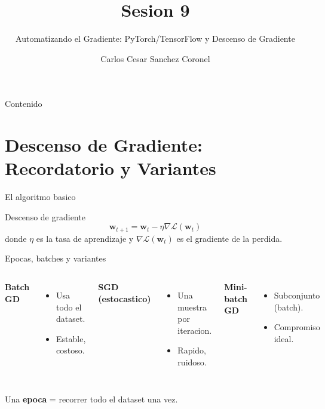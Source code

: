 \documentclass[aspectratio=169, 10pt, xcolor=table]{beamer}
\title[SESION 9 CALCULO]{\textbf{Sesion 9}}
\subtitle{Automatizando el Gradiente: PyTorch/TensorFlow y Descenso de Gradiente}
\author[Prof. C. Sanchez]{Carlos Cesar Sanchez Coronel}
\institute{\textbf{CALCULO Y ALGEBRA LINEAL PARA IA}}
\date{}
\begin{document}
\begin{frame}
    \titlepage
\end{frame}

\begin{frame}{Contenido}
    \tableofcontents
\end{frame}

\section{Descenso de Gradiente: Recordatorio y Variantes}

\begin{frame}{El algoritmo basico}
    \begin{block}{Descenso de gradiente}
        \[
        \mathbf{w}_{t+1} = \mathbf{w}_t - \eta \nabla \mathcal{L}(\mathbf{w}_t)
        \]
        donde $\eta$ es la tasa de aprendizaje y $\nabla \mathcal{L}(\mathbf{w}_t)$ es el gradiente de la perdida.
    \end{block}
\end{frame}

\begin{frame}{Epocas, batches y variantes}
    \begin{columns}[t]
        \textbf{Batch GD}
        \begin{itemize}
            \item Usa todo el dataset.
            \item Estable, costoso.
        \end{itemize}
        \textbf{SGD (estocastico)}
        \begin{itemize}
            \item Una muestra por iteracion.
            \item Rapido, ruidoso.
        \end{itemize}
        \textbf{Mini-batch GD}
        \begin{itemize}
            \item Subconjunto (batch).
            \item Compromiso ideal.
        \end{itemize}
    \end{columns}
    \vspace{0.3cm}
    Una \textbf{epoca} = recorrer todo el dataset una vez.
\end{frame}
\end{document}
